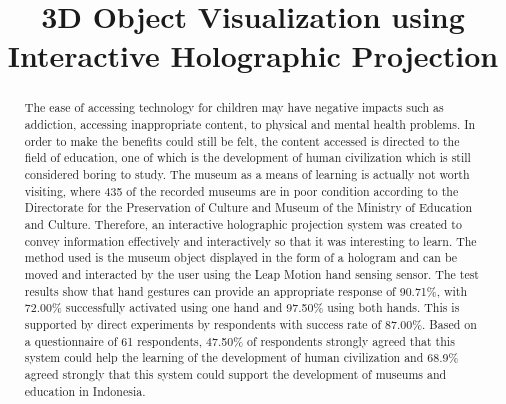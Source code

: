 \documentclass[conference]{IEEEtran}
\begin{document}
\title{3D Object Visualization using Interactive Holographic Projection}
	
\author{
	\and
	\and
}
\maketitle
	
\begin{abstract}
	The ease of accessing technology for children may have negative impacts such as addiction, accessing inappropriate content, to physical and mental health problems\cite{sundus2018impact}. In order to make the benefits could still be felt, the content accessed is directed to the field of education, one of which is the development of human civilization which is still considered boring to study\cite{wirawan_2018}. The museum as a means of learning is actually not worth visiting, where 435 of the recorded museums are in poor condition according to the Directorate for the Preservation of Culture and Museum of the Ministry of Education and Culture\cite{kemendikbud_2019}. Therefore, an interactive holographic projection system was created to convey information effectively and interactively so that it was interesting to learn. The method used is the museum object displayed in the form of a hologram and can be moved and interacted by the user using the Leap Motion hand sensing sensor. The test results show that hand gestures can provide an appropriate response of 90.71\%, with 72.00\% successfully activated using one hand and 97.50\% using both hands. This is supported by direct experiments by respondents with success rate of 87.00\%. Based on a questionnaire of 61 respondents, 47.50\% of respondents strongly agreed that this system could help the learning of the development of human civilization and 68.9\% agreed strongly that this system could support the development of museums and education in Indonesia.
\end{abstract}
	
\end{document}
